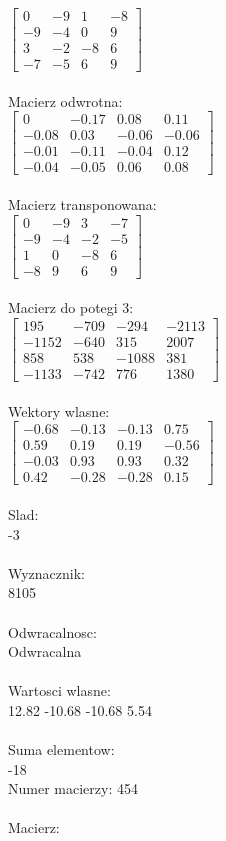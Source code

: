 \documentclass[a4paper,12pt]{article}
\begin{document}
$\begin{bmatrix} 0&-9&1&-8\\-9&-4&0&9\\3&-2&-8&6\\-7&-5&6&9 \end{bmatrix}$
\\
\\
Macierz odwrotna:\\

$\begin{bmatrix} 0&-0.17&0.08&0.11\\-0.08&0.03&-0.06&-0.06\\-0.01&-0.11&-0.04&0.12\\-0.04&-0.05&0.06&0.08 \end{bmatrix}$
\\
\\
Macierz transponowana:\\

$\begin{bmatrix} 0&-9&3&-7\\-9&-4&-2&-5\\1&0&-8&6\\-8&9&6&9 \end{bmatrix}$
\\
\\
Macierz do potegi 3:\\

$\begin{bmatrix} 195&-709&-294&-2113\\-1152&-640&315&2007\\858&538&-1088&381\\-1133&-742&776&1380 \end{bmatrix}$
\\
\\
Wektory wlasne:\\

$\begin{bmatrix} -0.68&-0.13&-0.13&0.75\\0.59&0.19&0.19&-0.56\\-0.03&0.93&0.93&0.32\\0.42&-0.28&-0.28&0.15 \end{bmatrix}$
\\
\\
Slad:\\
-3
\\
\\
Wyznacznik:\\
8105
\\
\\
Odwracalnosc:\\
Odwracalna
\\
\\
Wartosci wlasne:\\
12.82 -10.68 -10.68 5.54
\\
\\
Suma elementow:\\
-18
\\
\newpage
Numer macierzy:
454
\\
\\
Macierz:\\
\end{document}
